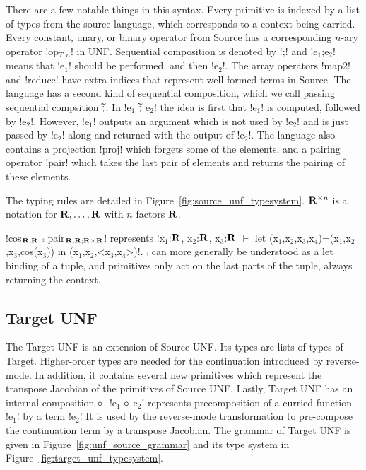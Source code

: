 There are a few notable things in this syntax. 
Every primitive is indexed by a list of types from the source language, 
which corresponds to a context being carried. 
Every constant, unary, or binary operator from Source has a corresponding $n$-ary operator !op$_{T,n}$! in UNF.
Sequential composition is denoted by !;! and !e$_{1}$;e$_{2}$! means that !e$_{1}$! should be performed, and then !e$_{2}$!.
The array operators !map2! and !reduce! have extra indices that represent well-formed terms in Source.
The language has a second kind of sequential composition, which we call passing sequential compsition $\widetilde{;}$.
In !e$_{1}$ $\widetilde{;}$ e$_{2}$! the idea is first that !e$_{1}$! is computed, followed by !e$_{2}$!. 
However, !e$_{1}$! outputs an argument which is not used by !e$_{2}$! and is just passed by !e$_{2}$! 
along and returned with the output of !e$_{2}$!.
The language also contains a projection !proj! which forgets some of the elements, 
and a pairing operator !pair! which takes the last pair of elements and returns the pairing of these elements.

The typing rules are detailed in Figure~\ref{fig:source_unf_typesystem}.
$\mathbf{R}^{\times n}$ is a notation for $\mathbf{R},\ldots,\mathbf{R}$ with $n$ factors $\mathbf{R}$.



\begin{example}
    !cos$_{\mathbf{R},\mathbf{R}}$ $\comp$ pair$_{\mathbf{R},\mathbf{R}; \mathbf{R}\times\mathbf{R}}$! 
    represents !x$_1$:$\mathbf{R}$, x$_2$:$\mathbf{R}$, x$_3$:$\mathbf{R}$ $\vdash$ let (x$_1$,x$_2$,x$_3$,x$_4$)=(x$_1$,x$_2$,x$_3$,cos(x$_3$)) in (x$_1$,x$_2$,<x$_3$,x$_4$>)!.
    $\comp$ can more generally be understood as a let binding of a tuple, and primitives only act on the last parts of the tuple, always returning the context.
\end{example}

\subsection{Target UNF} %
\label{sub:Target UNF}

The Target UNF is an extension of Source UNF. 
Its types are lists of types of Target. 
Higher-order types are needed for the continuation introduced by reverse-mode. 
In addition, it contains several new primitives which represent the transpose Jacobian of the primitives of Source UNF.
Lastly, Target UNF has an internal composition $\circ$. 
!e$_{1}$ $\circ$ e$_{2}$! represents precomposition of a curried function !e$_{1}$! by a term !e$_{2}$!
It is used by the reverse-mode transformation to pre-compose the continuation term by a transpose Jacobian.
The grammar of Target UNF is given in Figure~\ref{fig:unf_source_grammar} and its type system in Figure~\ref{fig:target_unf_typesystem}.

